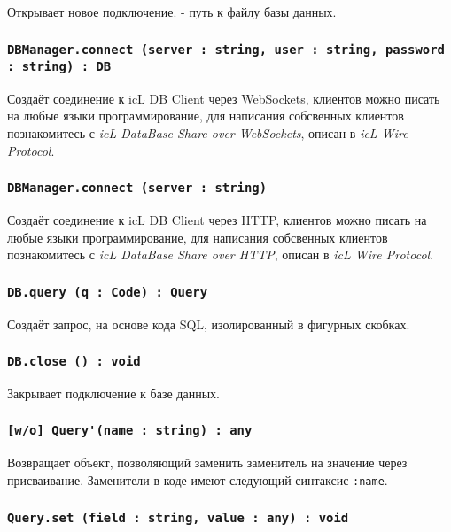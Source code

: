 Открывает новое подключение.  - путь к файлу базы данных.

\subsubsection{\lstinline|DBManager.connect (server : string, user : string, password : string) : DB|}

Создаёт соединение к icL DB Client через WebSockets, клиентов можно писать на любые языки программирование, для написания собсвенных клиентов познакомитесь с \textit{icL DataBase Share over WebSockets}, описан в \textit{icL Wire Protocol}.

\subsubsection{\lstinline|DBManager.connect (server : string)|}

Создаёт соединение к icL DB Client через HTTP, клиентов можно писать на любые языки программирование, для написания собсвенных клиентов познакомитесь с \textit{icL DataBase Share over HTTP}, описан в \textit{icL Wire Protocol}.

\subsubsection{\lstinline|DB.query (q : Code) : Query|}

Создаёт запрос, на основе кода SQL, изолированный в фигурных скобках.

\subsubsection{\lstinline|DB.close () : void|}

Закрывает подключение к базе данных.

\subsubsection{\lstinline|[w/o] Query'(name : string) : any|}

Возвращает объект, позволяющий заменить заменитель на значение через присваивание. Заменители в коде имеют следующий синтаксис \lstinline|:name|.

\subsubsection{\lstinline|Query.set (field : string, value : any) : void|}

